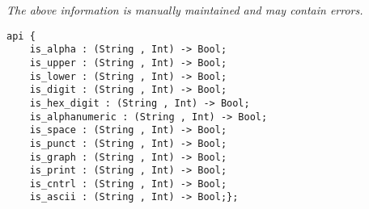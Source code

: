 \label{api:String\_Chartype}

{\tiny \it The above information is manually maintained and may contain errors.}
\begin{verbatim}
api {
    is_alpha : (String , Int) -> Bool;
    is_upper : (String , Int) -> Bool;
    is_lower : (String , Int) -> Bool;
    is_digit : (String , Int) -> Bool;
    is_hex_digit : (String , Int) -> Bool;
    is_alphanumeric : (String , Int) -> Bool;
    is_space : (String , Int) -> Bool;
    is_punct : (String , Int) -> Bool;
    is_graph : (String , Int) -> Bool;
    is_print : (String , Int) -> Bool;
    is_cntrl : (String , Int) -> Bool;
    is_ascii : (String , Int) -> Bool;};
\end{verbatim}
